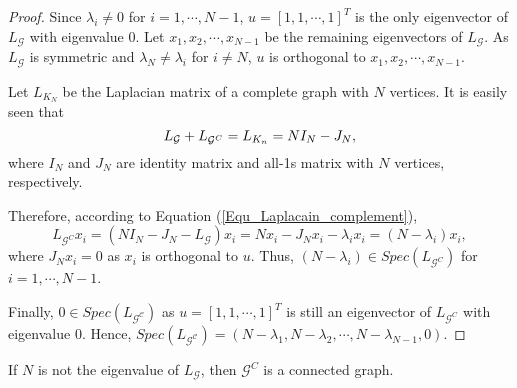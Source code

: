 \documentclass[journal]{IEEEtran}
\begin{document}
\begin{proof}
Since $\lambda_i \neq 0$ for $i=1,\cdots, N-1$,
$u=[1,1,\cdots,1]^T$ is the only eigenvector of $L_{\mathcal{G}}$ with eigenvalue $0$. Let $x_1,x_2,\cdots,x_{N-1}$ be the remaining eigenvectors of $L_{\mathcal{G}}$. As $L_{\mathcal{G}}$ is symmetric and $\lambda_N \neq \lambda_i$ for $i\neq N$, $u$ is orthogonal to $x_1,x_2,\cdots,x_{N-1}$.

	Let $L_{K_N}$ be the Laplacian matrix of a complete graph with $N$ vertices. It is easily seen that
	\begin{equation}{\label{Equ_Laplacain_complement}}
	L_{\mathcal{G}}+L_{\mathcal{G}^C}=L_{K_n}=NI_{N}-J_{N}, 
	\end{equation}
	where $I_N$ and $J_{N}$ are identity matrix and all-1s matrix with $N$ vertices, respectively. 



	
Therefore, according to Equation (\ref{Equ_Laplacain_complement}), 
	\begin{equation*}
	L_{\mathcal{G}^C}x_i=(NI_N-J_N-L_{\mathcal{G}})x_i=Nx_i-J_Nx_i-{\lambda}_i x_i=(N-{\lambda}_i)x_i,
	\end{equation*} 
	where $J_N x_i = 0$ as $x_i$ is orthogonal to $u$. Thus,  
	$(N-{\lambda}_i) \in Spec(L_{\mathcal{G}^C})$ for $i=1,\cdots, N-1$.
	
		Finally, $0 \in Spec(L_{\mathcal{G^C}})$ as $u=[1,1,\cdots,1]^T$ is still an eigenvector of $L_{\mathcal{G}^C}$ with eigenvalue $0$. 
Hence,
	$Spec(L_{\mathcal{G^C}})=(N-\lambda_1, N-\lambda_2,  \cdots,N-\lambda_{N-1} , 0)$.
\end{proof}
\begin{Lem}{\label{Lem_complement_connect}}{\rm{\cite{Merris1994Laplacian}}}
	If $N$ is not the eigenvalue of $L_{\mathcal{G}}$, %
	then $\mathcal{G}^C$ is a connected graph.
\end{Lem}
\end{document}
